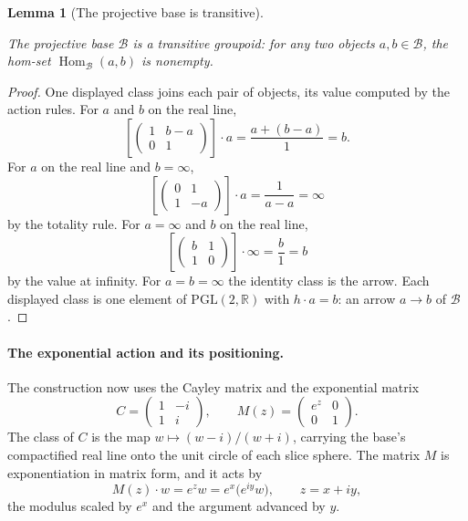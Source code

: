 \documentclass[11pt]{article}
\newcommand{\RR}{\mathbb{R}}
\providecommand{\uses}[1]{}
\theoremstyle{plain}
\newtheorem{lemma}[theorem]{Lemma}
\theoremstyle{definition}
\theoremstyle{remark}
\begin{document}
\begin{lemma}[The projective base is transitive]
\label{lem:projective-base-transitive}
\uses{def:two-worlds}
The projective base $\mathcal B$ is a transitive groupoid: for any two
objects $a,b\in\mathcal B$, the hom-set $\operatorname{Hom}_{\mathcal B}(a,b)$
is nonempty.
\end{lemma}

\begin{proof}
One displayed class joins each pair of objects, its value computed by the
action rules. For $a$ and $b$ on the real line,
\[
\left[\begin{pmatrix}1&b-a\\[2pt]0&1\end{pmatrix}\right]\cdot a
=\frac{a+(b-a)}{1}=b.
\]
For $a$ on the real line and $b=\infty$,
\[
\left[\begin{pmatrix}0&1\\[2pt]1&-a\end{pmatrix}\right]\cdot a
=\frac{1}{a-a}=\infty
\]
by the totality rule. For $a=\infty$ and $b$ on the real line,
\[
\left[\begin{pmatrix}b&1\\[2pt]1&0\end{pmatrix}\right]\cdot\infty
=\frac{b}{1}=b
\]
by the value at infinity. For $a=b=\infty$ the identity class is the
arrow. Each displayed class is one element of $\mathrm{PGL}(2,\RR)$ with
$h\cdot a=b$: an arrow $a\to b$ of $\mathcal B$.
\end{proof}

\paragraph{The exponential action and its positioning.}
The construction now uses the Cayley matrix and the exponential matrix
\[
 C=\begin{pmatrix}1&-i\\[2pt]1&i\end{pmatrix},\qquad
 M(z)=\begin{pmatrix}e^z&0\\[2pt]0&1\end{pmatrix}.
\]
The class of $C$ is the map $w\mapsto(w-i)/(w+i)$, carrying the base's
compactified real line onto the unit circle of each slice sphere.  The
matrix $M$ is exponentiation in matrix form, and it acts by
\[
  M(z)\cdot w=e^{z}w=e^{x}\bigl(e^{iy}w\bigr),\qquad z=x+iy,
\]
the modulus scaled by $e^{x}$ and the argument advanced by $y$.
\end{document}

